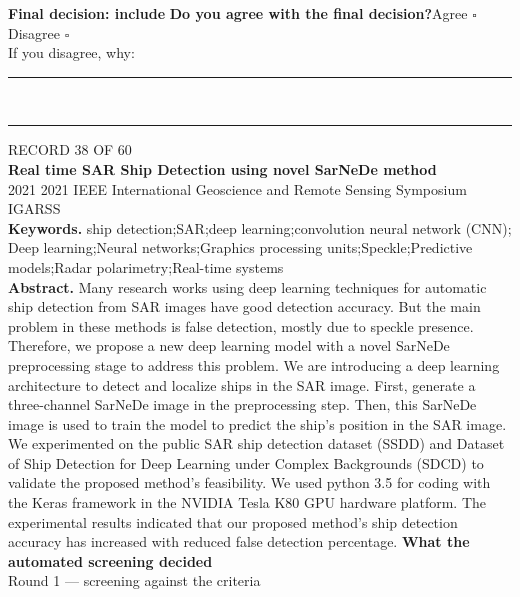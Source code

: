 \documentclass[11pt,a4paper]{article}
\begin{document}
{\small\textbf{Final decision: include}}
\vspace{2mm}
{\small\textbf{Do you agree with the final decision?}\quad{}Agree $\square$\qquad{}Disagree $\square$}\\[1mm]
{\footnotesize\color{soft}If you disagree, why:}\\[1mm]
\color{rule}\rule{\linewidth}{0.3pt}\\[3mm]\rule{\linewidth}{0.3pt}\color{black}
\clearpage
{\color{soft}\footnotesize RECORD 38 OF 60}\\[1mm]
{\large\bfseries Real time SAR Ship Detection using novel SarNeDe method}\\[1.5mm]
{\color{soft}\small 2021 \textperiodcentered{} 2021 IEEE International Geoscience and Remote Sensing Symposium IGARSS}\\[2mm]
{\small\textbf{Keywords.} ship detection;SAR;deep learning;convolution neural network (CNN); Deep learning;Neural networks;Graphics processing units;Speckle;Predictive models;Radar polarimetry;Real-time systems}\\[2mm]
{\small\textbf{Abstract.} Many research works using deep learning techniques for automatic ship detection from SAR images have good detection accuracy. But the main problem in these methods is false detection, mostly due to speckle presence. Therefore, we propose a new deep learning model with a novel SarNeDe preprocessing stage to address this problem. We are introducing a deep learning architecture to detect and localize ships in the SAR image. First, generate a three-channel SarNeDe image in the preprocessing step. Then, this SarNeDe image is used to train the model to predict the ship's position in the SAR image. We experimented on the public SAR ship detection dataset (SSDD) and Dataset of Ship Detection for Deep Learning under Complex Backgrounds (SDCD) to validate the proposed method's feasibility. We used python 3.5 for coding with the Keras framework in the NVIDIA Tesla K80 GPU hardware platform. The experimental results indicated that our proposed method's ship detection accuracy has increased with reduced false detection percentage.}
\vspace{3mm}
\vspace{2.5mm}
{\small\textbf{What the automated screening decided}}\\[2mm]
{\footnotesize\color{soft}Round 1 --- screening against the criteria}\\[0.5mm]
\end{document}
